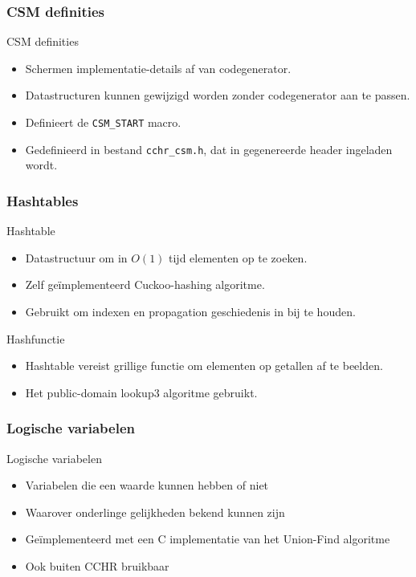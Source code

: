 \documentclass{beamer}
\newcommand{\code}[1]{{\tt #1}}
\begin{document}
\begin{frame}
  \frametitle{CSM definities}
  \begin{block}{CSM definities}
    \begin{itemize}
      \item Schermen implementatie-details af van codegenerator.
      \item Datastructuren kunnen gewijzigd worden zonder codegenerator aan te passen.
      \item Definieert de \code{CSM\_START} macro.
      \item Gedefinieerd in bestand \code{cchr\_csm.h}, dat in gegenereerde header ingeladen wordt.
    \end{itemize}
  \end{block}
\end{frame}

\begin{frame}
  \frametitle{Hashtables}
  \begin{block}{Hashtable}
    \begin{itemize}
      \item Datastructuur om in $O(1)$ tijd elementen op te zoeken.
      \item Zelf ge\"implementeerd Cuckoo-hashing algoritme.
      \item Gebruikt om indexen en propagation geschiedenis in bij te houden.
    \end{itemize}
  \end{block}
  \begin{block}{Hashfunctie}
    \begin{itemize}
      \item Hashtable vereist grillige functie om elementen op getallen af te beelden.
      \item Het public-domain lookup3 algoritme gebruikt.
    \end{itemize}
  \end{block}
\end{frame}

\begin{frame}
  \frametitle{Logische variabelen}
  \begin{block}{Logische variabelen}
    \begin{itemize}
      \item Variabelen die een waarde kunnen hebben of niet
      \item Waarover onderlinge gelijkheden bekend kunnen zijn
      \item Ge\"implementeerd met een C implementatie van het
            Union-Find algoritme
      \item Ook buiten CCHR bruikbaar
    \end{itemize}
  \end{block}
\end{frame}
\end{document}
